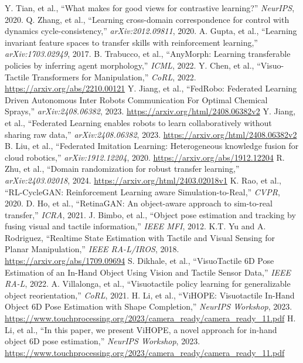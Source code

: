 \documentclass[a4paper,fleqn,10pt,twocolumn]{template_v1.0}
\begin{document}
\begin{thebibliography}{99}
Y. Tian, et al., ``What makes for good views for contrastive learning?'' {\it NeurIPS}, 2020.
Q. Zhang, et al., ``Learning cross-domain correspondence for control with dynamics cycle-consistency,'' {\it arXiv:2012.09811}, 2020.
A. Gupta, et al., ``Learning invariant feature spaces to transfer skills with reinforcement learning,'' {\it arXiv:1703.02949}, 2017.
B. Trabucco, et al., ``AnyMorph: Learning transferable policies by inferring agent morphology,'' {\it ICML}, 2022.
Y. Chen, et al., ``Visuo-Tactile Transformers for Manipulation,'' {\it CoRL}, 2022. \url{https://arxiv.org/abs/2210.00121}
Y. Jiang, et al., ``FedRobo: Federated Learning Driven Autonomous Inter Robots Communication For Optimal Chemical Sprays,'' {\it arXiv:2408.06382}, 2023. \url{https://arxiv.org/html/2408.06382v2}
Y. Jiang, et al., ``Federated Learning enables robots to learn collaboratively without sharing raw data,'' {\it arXiv:2408.06382}, 2023. \url{https://arxiv.org/html/2408.06382v2}
B. Liu, et al., ``Federated Imitation Learning: Heterogeneous knowledge fusion for cloud robotics,'' {\it arXiv:1912.12204}, 2020. \url{https://arxiv.org/abs/1912.12204}
R. Zhu, et al., ``Domain randomization for robust transfer learning,'' {\it arXiv:2403.02018}, 2024. \url{https://arxiv.org/html/2403.02018v1}
K. Rao, et al., ``RL-CycleGAN: Reinforcement Learning aware Simulation-to-Real,'' {\it CVPR}, 2020.
D. Ho, et al., ``RetinaGAN: An object-aware approach to sim-to-real transfer,'' {\it ICRA}, 2021.
J. Bimbo, et al., ``Object pose estimation and tracking by fusing visual and tactile information,'' {\it IEEE MFI}, 2012.
K.T. Yu and A. Rodriguez, ``Realtime State Estimation with Tactile and Visual Sensing for Planar Manipulation,'' {\it IEEE RA-L/IROS}, 2018. \url{https://arxiv.org/abs/1709.09694}
S. Dikhale, et al., ``VisuoTactile 6D Pose Estimation of an In-Hand Object Using Vision and Tactile Sensor Data,'' {\it IEEE RA-L}, 2022.
A. Villalonga, et al., ``Visuotactile policy learning for generalizable object reorientation,'' {\it CoRL}, 2021.
H. Li, et al., ``ViHOPE: Visuotactile In-Hand Object 6D Pose Estimation with Shape Completion,'' {\it NeurIPS Workshop}, 2023. \url{https://www.touchprocessing.org/2023/camera_ready/camera_ready_11.pdf}
H. Li, et al., ``In this paper, we present ViHOPE, a novel approach for in-hand object 6D pose estimation,'' {\it NeurIPS Workshop}, 2023. \url{https://www.touchprocessing.org/2023/camera_ready/camera_ready_11.pdf}

\end{thebibliography}
\end{document}
